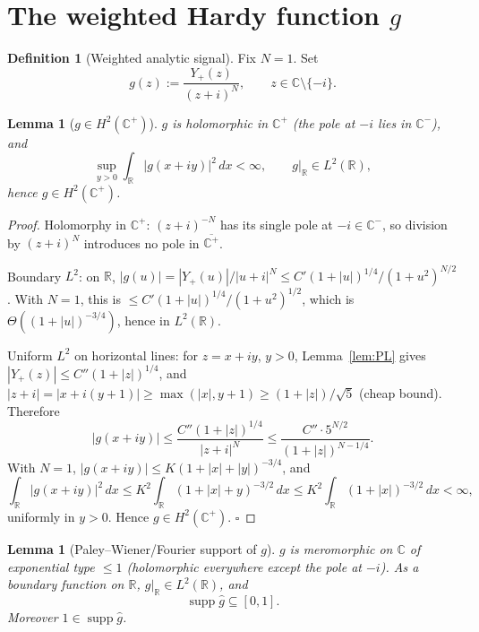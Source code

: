 \documentclass[11pt]{article}
\newtheorem{lemma}[theorem]{Lemma}
\theoremstyle{definition}
\newtheorem{definition}[theorem]{Definition}
\newcommand{\R}{\mathbb{R}}
\newcommand{\C}{\mathbb{C}}
\newcommand{\Cp}{\C^{+}}
\newcommand{\Cm}{\C^{-}}
\newcommand{\supp}{\operatorname{supp}}
\begin{document}
\section{The weighted Hardy function $g$}

\begin{definition}[Weighted analytic signal]\label{def:g}
Fix $N=1$. Set
\[
g(z):=\frac{Y_+(z)}{(z+i)^N},\qquad z\in\C\setminus\{-i\}.
\]
\end{definition}

\begin{lemma}[$g\in H^2(\Cp)$]\label{lem:gH2}
$g$ is holomorphic in $\Cp$ (the pole at $-i$ lies in $\Cm$), and
\[
\sup_{y>0}\int_\R|g(x+iy)|^2\,dx<\infty,\qquad g|_\R\in L^2(\R),
\]
hence $g\in H^2(\Cp)$.
\end{lemma}

\begin{proof}
Holomorphy in $\Cp$: $(z+i)^{-N}$ has its single pole at $-i\in\Cm$, so division by $(z+i)^N$ introduces no pole in $\overline{\Cp}$.

Boundary $L^2$: on $\R$, $|g(u)|=|Y_+(u)|/|u+i|^N\le C'(1+|u|)^{1/4}/(1+u^2)^{N/2}$. With $N=1$, this is $\le C'(1+|u|)^{1/4}/(1+u^2)^{1/2}$, which is $\Theta((1+|u|)^{-3/4})$, hence in $L^2(\R)$.

Uniform $L^2$ on horizontal lines: for $z=x+iy$, $y>0$, Lemma~\ref{lem:PL} gives $|Y_+(z)|\le C''(1+|z|)^{1/4}$, and $|z+i|=|x+i(y+1)|\ge\max(|x|,y+1)\ge(1+|z|)/\sqrt 5$ (cheap bound). Therefore
\[
|g(x+iy)|\le\frac{C''(1+|z|)^{1/4}}{|z+i|^N}\le\frac{C''\cdot 5^{N/2}}{(1+|z|)^{N-1/4}}.
\]
With $N=1$, $|g(x+iy)|\le K(1+|x|+|y|)^{-3/4}$, and
\[
\int_\R|g(x+iy)|^2\,dx\le K^2\int_\R(1+|x|+y)^{-3/2}\,dx\le K^2\int_\R(1+|x|)^{-3/2}\,dx<\infty,
\]
uniformly in $y>0$. Hence $g\in H^2(\Cp)$. $\square$
\end{proof}

\begin{lemma}[Paley--Wiener/Fourier support of $g$]\label{lem:supp-g}
$g$ is meromorphic on $\C$ of exponential type $\le 1$ (holomorphic everywhere except the pole at $-i$). As a boundary function on $\R$, $g|_\R\in L^2(\R)$, and
\[
\supp\hat g\subseteq[0,1].
\]
Moreover $1\in\supp\hat g$.
\end{lemma}
\end{document}
